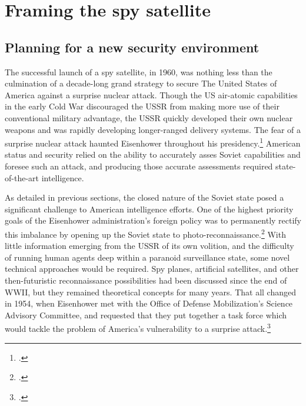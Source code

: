\documentclass{report}
\begin{document}
\section{Framing the spy satellite}
\subsection{Planning for a new security environment}
The successful launch of a spy satellite, in 1960, was nothing less than the culmination of a decade-long grand strategy to secure The United States of America against a surprise nuclear attack. Though the US air-atomic capabilities in the early Cold War discouraged the USSR from making more use of their conventional military advantage, the USSR quickly developed their own nuclear weapons and was rapidly developing longer-ranged delivery systems. The fear of a surprise nuclear attack haunted Eisenhower throughout his presidency.\footcite[p.~68]{killian_sputnik_1977} American status and security relied on the ability to accurately asses Soviet capabilities and foresee such an attack, and producing those accurate assessments required state-of-the-art intelligence.

As detailed in previous sections, the closed nature of the Soviet state posed a significant challenge to American intelligence efforts. One of the highest priority goals of the Eisenhower administration's foreign policy was to permanently rectify this imbalance by opening up the Soviet state to photo-reconnaissance.\footcite[p.~65]{hayes_struggling_1994} With little information emerging from the USSR of its own volition, and the difficulty of running human agents deep within a paranoid surveillance state, some novel technical approaches would be required. Spy planes, artificial satellites, and other then-futuristic reconnaissance possibilities had been discussed since the end of WWII, but they remained theoretical concepts for many years. That all changed in 1954, when Eisenhower met with the Office of Defense Mobilization's Science Advisory Committee, and requested that they put together a task force which would tackle the problem of America's vulnerability to a surprise attack.\footcite[p.~67. The president's science advisor described this moment as the starting point for ``any complete account of how science advice was mobilized for the use of President Eisenhower.'']{killian_sputnik_1977}
\end{document}
